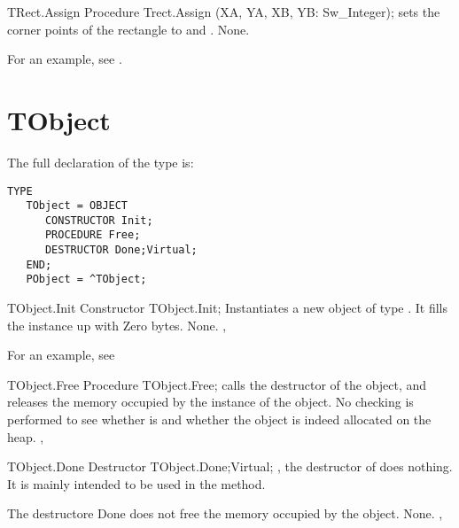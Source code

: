 
\begin{procedure}{TRect.Assign}
\Declaration
Procedure Trect.Assign (XA, YA, XB, YB: Sw\_Integer);
\Description
{} sets the corner points of the rectangle to  and 
.
\Errors
None.
\SeeAlso
{}
\end{procedure}

For an example, see .

\section{TObject}
\label{se:TObject}

The full declaration of the  type is:
\begin{verbatim}
TYPE
   TObject = OBJECT
      CONSTRUCTOR Init;
      PROCEDURE Free;
      DESTRUCTOR Done;Virtual;
   END;
   PObject = ^TObject;
\end{verbatim}
\begin{procedure}{TObject.Init}
\Declaration
Constructor TObject.Init;
\Description
Instantiates a new object of type . It fills the instance up
with Zero bytes.
\Errors
None.
\SeeAlso
{}, 
\end{procedure}

For an example, see 

\begin{procedure}{TObject.Free}
\Declaration
Procedure TObject.Free;
\Description
{} calls the destructor of the object, and releases the memory
occupied by the instance of the object.
\Errors
No checking is performed to see whether  is  and whether
the object is indeed allocated on the heap.
\SeeAlso
{}, 
\end{procedure}


\begin{procedure}{TObject.Done}
\Declaration
Destructor TObject.Done;Virtual;
\Description
{}, the destructor of  does nothing. It is mainly
intended to be used in the  method.

The destructore Done does not free the memory occupied by the object.
\Errors
None.
\SeeAlso
{}, 
\end{procedure}

